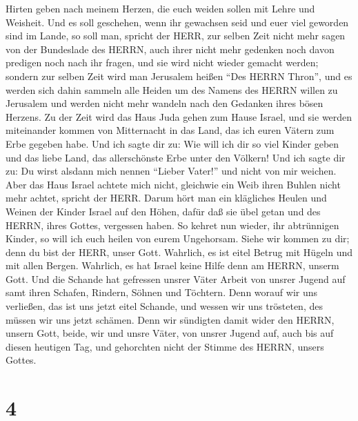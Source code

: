 Hirten geben nach meinem Herzen, die euch weiden sollen mit Lehre und
Weisheit.  Und es soll geschehen, wenn ihr gewachsen seid
und euer viel geworden sind im Lande, so soll man, spricht der HERR, zur
selben Zeit nicht mehr sagen von der Bundeslade des HERRN, auch ihrer
nicht mehr gedenken noch davon predigen noch nach ihr fragen, und sie
wird nicht wieder gemacht werden;  sondern zur selben Zeit
wird man Jerusalem heißen ``Des HERRN Thron'', und es werden sich dahin
sammeln alle Heiden um des Namens des HERRN willen zu Jerusalem und
werden nicht mehr wandeln nach den Gedanken ihres bösen Herzens.
 Zu der Zeit wird das Haus Juda gehen zum Hause Israel, und
sie werden miteinander kommen von Mitternacht in das Land, das ich euren
Vätern zum Erbe gegeben habe.  Und ich sagte dir zu: Wie
will ich dir so viel Kinder geben und das liebe Land, das allerschönste
Erbe unter den Völkern! Und ich sagte dir zu: Du wirst alsdann mich
nennen ``Lieber Vater!'' und nicht von mir weichen.  Aber
das Haus Israel achtete mich nicht, gleichwie ein Weib ihren Buhlen
nicht mehr achtet, spricht der HERR.  Darum hört man ein
klägliches Heulen und Weinen der Kinder Israel auf den Höhen, dafür daß
sie übel getan und des HERRN, ihres Gottes, vergessen haben.
 So kehret nun wieder, ihr abtrünnigen Kinder, so will ich
euch heilen von eurem Ungehorsam. Siehe wir kommen zu dir; denn du bist
der HERR, unser Gott.  Wahrlich, es ist eitel Betrug mit
Hügeln und mit allen Bergen. Wahrlich, es hat Israel keine Hilfe denn am
HERRN, unserm Gott.  Und die Schande hat gefressen unsrer
Väter Arbeit von unsrer Jugend auf samt ihren Schafen, Rindern, Söhnen
und Töchtern.  Denn worauf wir uns verließen, das ist uns
jetzt eitel Schande, und wessen wir uns trösteten, des müssen wir uns
jetzt schämen. Denn wir sündigten damit wider den HERRN, unsern Gott,
beide, wir und unsre Väter, von unsrer Jugend auf, auch bis auf diesen
heutigen Tag, und gehorchten nicht der Stimme des HERRN, unsers Gottes.

\hypertarget{section-3}{%
\section{4}\label{section-3}}

